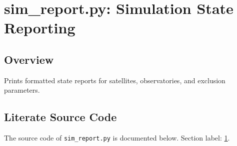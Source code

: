 \documentclass[10pt,a4paper]{report}
\begin{document}
\chapter{sim\_report.py: Simulation State Reporting}
\label{sec:simreport}

\section*{Overview}
Prints formatted state reports for satellites, observatories, and exclusion parameters.

\section*{Literate Source Code}
The source code of \texttt{sim\_report.py} is documented below. Section label: \ref{sec:simreport}.
\end{document}
